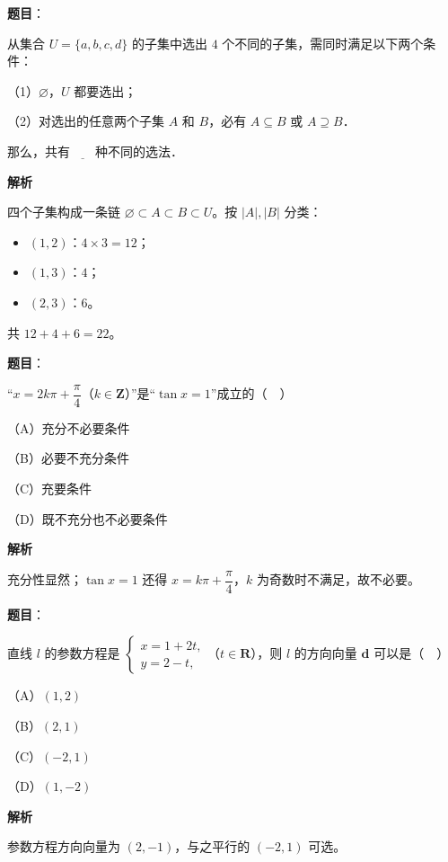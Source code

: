 \begin{answer}

\textbf{题目}：

从集合 $U=\{a,b,c,d\}$ 的子集中选出 $4$ 个不同的子集，需同时满足以下两个条件：

（1）$\varnothing$，$U$ 都要选出；

（2）对选出的任意两个子集 $A$ 和 $B$，必有 $A\subseteq B$ 或 $A\supseteq B$．

那么，共有$\underline{\qquad}$种不同的选法．

\textbf{解析}

四个子集构成一条链 $\varnothing\subset A\subset B\subset U$。按 $|A|,|B|$ 分类：

\begin{itemize}
\item $(1,2)$：$4\times3=12$；
\item $(1,3)$：$4$；
\item $(2,3)$：$6$。
\end{itemize}

共 $12+4+6=22$。


\end{answer}
\begin{answer}

\textbf{题目}：

“$x=2k\pi+\dfrac\pi4$（$k\in\mathbf Z$）”是“$\tan x=1$”成立的（　）

（A）充分不必要条件

（B）必要不充分条件

（C）充要条件

（D）既不充分也不必要条件

\textbf{解析}

充分性显然；$\tan x=1$ 还得 $x=k\pi+\dfrac\pi4$，$k$ 为奇数时不满足，故不必要。


\end{answer}
\begin{answer}

\textbf{题目}：

直线 $l$ 的参数方程是 $\begin{cases}x=1+2t,\\ y=2-t,\end{cases}$（$t\in\mathbf R$），则 $l$ 的方向向量 $\boldsymbol d$ 可以是（　）

（A）$(1,2)$

（B）$(2,1)$

（C）$(-2,1)$

（D）$(1,-2)$

\textbf{解析}

参数方程方向向量为 $(2,-1)$，与之平行的 $(-2,1)$ 可选。


\end{answer}
